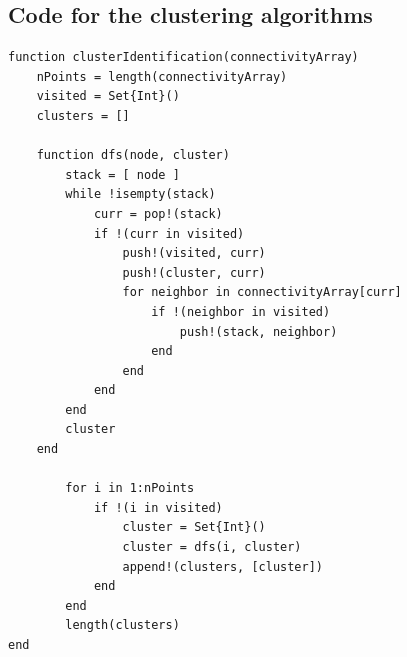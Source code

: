 \documentclass[a4paper]{article}
\begin{document}
\subsection{Code for the clustering algorithms}%
\label{sub:code for the clustering algorithms}
\begin{lstlisting}
function clusterIdentification(connectivityArray)
    nPoints = length(connectivityArray)
    visited = Set{Int}()
    clusters = []

    function dfs(node, cluster)
        stack = [ node ]
        while !isempty(stack)
            curr = pop!(stack)
            if !(curr in visited)
                push!(visited, curr)
                push!(cluster, curr)
                for neighbor in connectivityArray[curr]
                    if !(neighbor in visited)
                        push!(stack, neighbor)
                    end
                end
            end
        end
        cluster
    end

        for i in 1:nPoints
            if !(i in visited)
                cluster = Set{Int}()
                cluster = dfs(i, cluster)
                append!(clusters, [cluster])
            end
        end
        length(clusters)
end
	
\end{lstlisting}
\end{document}
